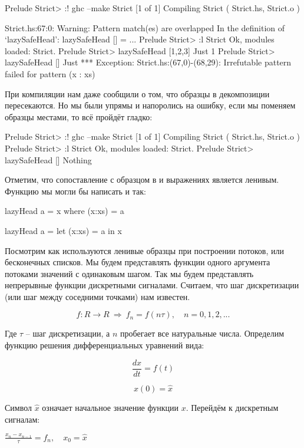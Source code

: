 \begin{code}
Prelude Strict> :! ghc --make Strict
[1 of 1] Compiling Strict           ( Strict.hs, Strict.o )

Strict.hs:67:0:
    Warning: Pattern match(es) are overlapped
             In the definition of `lazySafeHead': lazySafeHead [] = ...
Prelude Strict> :l Strict
Ok, modules loaded: Strict.
Prelude Strict> lazySafeHead [1,2,3]
Just 1
Prelude Strict> lazySafeHead []
Just *** Exception: Strict.hs:(67,0)-(68,29): Irrefutable 
pattern failed for pattern (x : xs)
\end{code}

При компиляции нам даже сообщили о том, что образцы в декомпозиции
пересекаются. Но мы были упрямы и напоролись на ошибку, если мы поменяем
образцы местами, то всё пройдёт гладко:


\begin{code}
Prelude Strict> :! ghc --make Strict
[1 of 1] Compiling Strict           ( Strict.hs, Strict.o )
Prelude Strict> :l Strict
Ok, modules loaded: Strict.
Prelude Strict> lazySafeHead []
Nothing
\end{code}

Отметим, что сопоставление с образцом в  и  выражениях
является ленивым. Функцию  мы могли бы написать и так:


\begin{code}
lazyHead a = x
    where (x:xs) = a

lazyHead a = 
    let (x:xs) = a
    in  x
\end{code}

Посмотрим как используются ленивые образцы при построении потоков, или
бесконечных списков. Мы будем представлять функции одного аргумента
потоками значений с одинаковым шагом. Так мы будем представлять
непрерывные функции дискретными сигналами. Считаем, что шаг
дискретизации (или шаг между соседними точками) нам известен.

\[f : R \rightarrow R \ \Rightarrow \ f_n = f(n \tau),\quad n = 0,1,2, ...\]

Где $\tau$ -- шаг дискретизации, а $n$ пробегает все натуральные числа.
Определим функцию решения дифференциальных уравнений вида:

\[\frac{dx}{dt} = f(t)\]

\[x(0) = \hat{x}\]

Символ $\hat{x}$ означает начальное значение функции $x$. Перейдём к
дискретным сигналам:

$\frac{x_n - x_{n-1}}{\tau} = f_n, \quad x_0 = \hat{x}$

